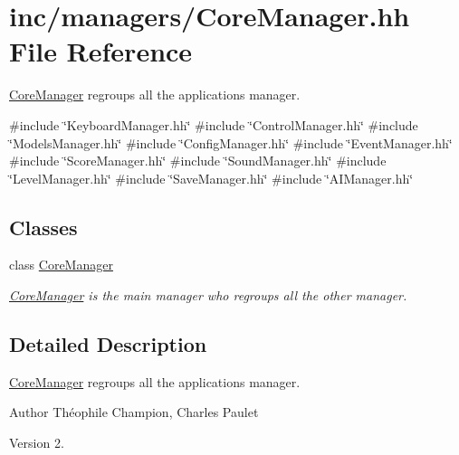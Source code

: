 \hypertarget{CoreManager_8hh}{}\section{inc/managers/\+Core\+Manager.hh File Reference}
\label{CoreManager_8hh}


\hyperlink{classCoreManager}{Core\+Manager} regroups all the application\textquotesingle{}s manager.  


{\ttfamily \#include \char`\"{}Keyboard\+Manager.\+hh\char`\"{}}\newline
{\ttfamily \#include \char`\"{}Control\+Manager.\+hh\char`\"{}}\newline
{\ttfamily \#include \char`\"{}Models\+Manager.\+hh\char`\"{}}\newline
{\ttfamily \#include \char`\"{}Config\+Manager.\+hh\char`\"{}}\newline
{\ttfamily \#include \char`\"{}Event\+Manager.\+hh\char`\"{}}\newline
{\ttfamily \#include \char`\"{}Score\+Manager.\+hh\char`\"{}}\newline
{\ttfamily \#include \char`\"{}Sound\+Manager.\+hh\char`\"{}}\newline
{\ttfamily \#include \char`\"{}Level\+Manager.\+hh\char`\"{}}\newline
{\ttfamily \#include \char`\"{}Save\+Manager.\+hh\char`\"{}}\newline
{\ttfamily \#include \char`\"{}A\+I\+Manager.\+hh\char`\"{}}\newline
\subsection*{Classes}
\begin{DoxyCompactItemize}
\item 
class \hyperlink{classCoreManager}{Core\+Manager}
\begin{DoxyCompactList}\small\item\em \hyperlink{classCoreManager}{Core\+Manager} is the main manager who regroups all the other manager. \end{DoxyCompactList}\end{DoxyCompactItemize}


\subsection{Detailed Description}
\hyperlink{classCoreManager}{Core\+Manager} regroups all the application\textquotesingle{}s manager. 

\begin{DoxyAuthor}{Author}
Théophile Champion, Charles Paulet 
\end{DoxyAuthor}
\begin{DoxyVersion}{Version}
2. 
\end{DoxyVersion}
